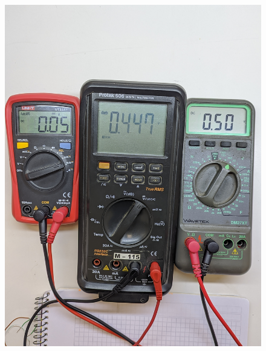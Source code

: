 \documentclass[chaptersright]{informeutn}
\begin{document}
\begin{figure}[!ht]
\begin{minipage}{0.25\textwidth}
          \includegraphics[width=1\textwidth]{pictures/mult_crkt-1_05.jpg}
        \end{minipage}
        \begin{minipage}{0.25\textwidth}

\end{minipage}
\end{figure}
\end{document}
